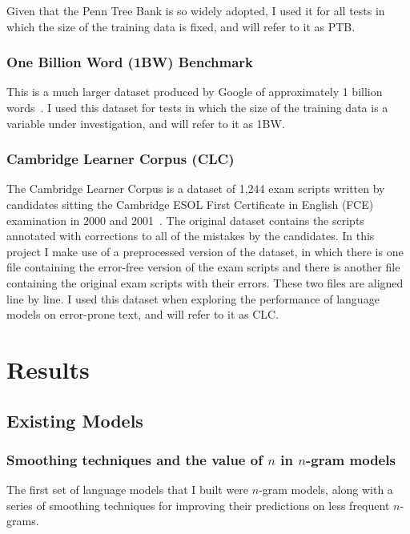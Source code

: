 \documentclass[a4paper, 12pt]{report}
\begin{document}
Given that the Penn Tree Bank is so widely adopted, I used it for all tests in which the size of the training data is fixed, and will refer to it as PTB.

\subsubsection{One Billion Word (1BW) Benchmark}

This is a much larger dataset produced by Google of approximately 1 billion words~\cite{1bw:chelba2013}. I used this dataset for tests in which the size of the training data is a variable under investigation, and will refer to it as 1BW.

\subsubsection{Cambridge Learner Corpus (CLC)}

The Cambridge Learner Corpus is a dataset of 1,244 exam scripts written by candidates sitting the Cambridge ESOL First Certificate in English (FCE) examination in 2000 and 2001~\cite{clc:yannakoudakis2011}. The original dataset contains the scripts annotated with corrections to all of the mistakes by the candidates. In this project I make use of a preprocessed version of the dataset, in which there is one file containing the error-free version of the exam scripts and there is another file containing the original exam scripts with their errors. These two files are aligned line by line. I used this dataset when exploring the performance of language models on error-prone text, and will refer to it as CLC.

\section{Results}

\subsection{Existing Models}

\subsubsection*{Smoothing techniques and the value of $n$ in $n$-gram models}

The first set of language models that I built were $n$-gram models, along with a series of smoothing techniques for improving their predictions on less frequent $n$-grams.
\end{document}
